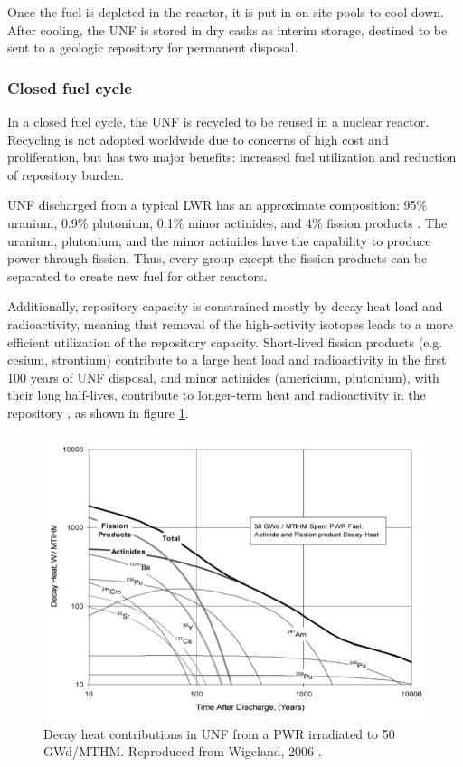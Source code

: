 Once the fuel is depleted in the reactor, it is put in on-site pools to cool down.
After cooling, the \gls{UNF}
is stored in dry casks as interim storage, destined to be sent to a geologic repository
for permanent disposal.

\subsubsection{Closed fuel cycle}
In a closed fuel cycle, the \gls{UNF} is recycled to be reused
in a nuclear reactor. Recycling is not adopted worldwide due to
concerns of high cost and proliferation, but has two major
benefits: increased fuel utilization and reduction of repository
burden.

\gls{UNF} discharged from a typical \gls{LWR} has an approximate
composition: 95\% uranium, 0.9\% plutonium, 0.1\%
minor actinides, and 4\% fission products \cite{feiveson_spent_2011}.
The uranium, plutonium, and the minor actinides have the capability
to produce power through fission. Thus, every group except the
fission products can be separated to create new fuel for other reactors.

Additionally, repository capacity is constrained mostly by decay heat
load and radioactivity, meaning that removal of the high-activity
isotopes leads to a more efficient utilization of the repository
capacity. Short-lived fission products (e.g. cesium, strontium) contribute
to a large heat load and radioactivity in the first 100 years of \gls{UNF} disposal,
and minor actinides (americium, plutonium), with their long half-lives,
contribute to longer-term heat and radioactivity in the repository \cite{wigeland_separations_2006},
as shown in figure \ref{fig:decay_heat}.

\begin{figure}[htbp!]
	\begin{center}
		\hspace*{-1.5cm}
		\includegraphics[scale=0.6]{./images/decay_heat.png}
	\end{center}
	\caption{Decay heat contributions in \gls{UNF} from a \gls{PWR} irradiated
		to 50 GWd/MTHM. Reproduced from Wigeland, 2006 \cite{wigeland_separations_2006}.}
	\label{fig:decay_heat}
\end{figure}


